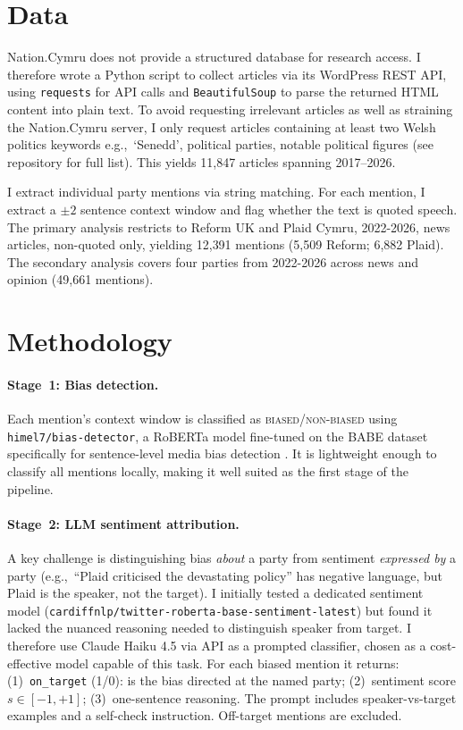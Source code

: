 \documentclass[10pt]{article}
\begin{document}
\section{Data}

Nation.Cymru does not provide a structured database for research access. I therefore wrote a Python script to collect articles via its WordPress REST API, using \texttt{requests} for API calls and \texttt{BeautifulSoup} to parse the returned HTML content into plain text. To avoid requesting irrelevant articles as well as straining the Nation.Cymru server, I only request articles containing at least two Welsh politics keywords e.g.,\ `Senedd', political parties, notable political figures (see repository for full list). This yields 11{,}847 articles spanning 2017--2026.

I extract individual party mentions via string matching. For each mention, I extract a $\pm 2$ sentence context window and flag whether the text is quoted speech. The primary analysis restricts to Reform UK and Plaid Cymru, 2022-2026, news articles, non-quoted only, yielding 12{,}391 mentions (5{,}509 Reform; 6{,}882 Plaid). The secondary analysis covers four parties from 2022-2026 across news and opinion (49{,}661 mentions).

\section{Methodology}

\paragraph{Stage~1: Bias detection.}
Each mention's context window is classified as \textsc{biased}/\textsc{non-biased} using \texttt{himel7/bias-detector}, a RoBERTa model fine-tuned on the BABE dataset specifically for sentence-level media bias detection \citep{ghosh2025}. It is lightweight enough to classify all mentions locally, making it well suited as the first stage of the pipeline.

\paragraph{Stage~2: LLM sentiment attribution.}
A key challenge is distinguishing bias \textit{about} a party from sentiment \textit{expressed by} a party (e.g.,\ ``Plaid criticised the devastating policy'' has negative language, but Plaid is the speaker, not the target). I initially tested a dedicated sentiment model (\texttt{cardiffnlp/twitter-roberta-base-sentiment-latest}) but found it lacked the nuanced reasoning needed to distinguish speaker from target. I therefore use Claude Haiku 4.5 \citep{anthropic2025} via API as a prompted classifier, chosen as a cost-effective model capable of this task. For each biased mention it returns: (1)~\texttt{on\_target} (1/0): is the bias directed at the named party; (2)~sentiment score $s \in [-1, +1]$; (3)~one-sentence reasoning. The prompt includes speaker-vs-target examples and a self-check instruction. Off-target mentions are excluded.
\end{document}
